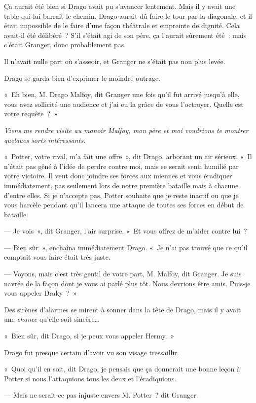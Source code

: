 Ça aurait été bien si Drago avait pu s'avancer lentement.
Mais il y avait une table qui lui barrait le chemin, Drago aurait dû faire le tour par la diagonale, et il était impossible de le faire d'une façon théâtrale et empreinte de dignité.
Cela avait-il été délibéré~?
S'il s'était agi de son père, ça l'aurait sûrement été~; mais c'était Granger, donc probablement pas.

Il n'avait nulle part où s'asseoir, et Granger ne s'était pas non plus levée.

Drago se garda bien d'exprimer le moindre outrage.

«~Eh bien, M. Drago Malfoy, dit Granger une fois qu'il fut arrivé jusqu'à elle, vous avez sollicité une audience et j'ai eu la grâce de vous l'octroyer.
Quelle est votre requête~?~»

\emph{Viens me rendre visite au manoir Malfoy, mon père et moi voudrions te montrer quelques sorts intéressants.}

«~Potter, votre rival, m'a fait une offre~», dit Drago, arborant un air sérieux.
«~Il n'était pas gêné à l'idée de perdre contre moi, mais se serait senti humilié par votre victoire.
Il veut donc joindre ses forces aux miennes et vous éradiquer immédiatement, pas seulement lors de notre première bataille mais à chacune d'entre elles.
Si je n'accepte pas, Potter souhaite que je reste inactif ou que je vous harcèle pendant qu'il lancera une attaque de toutes ses forces en début de bataille.

--- Je vois~», dit Granger, l'air surprise.
«~Et vous offrez de m'aider contre lui~?

--- Bien sûr~», enchaîna immédiatement Drago.
«~Je n'ai pas trouvé que ce qu'il comptait vous faire était très juste.

--- Voyons, mais c'est très gentil de votre part, M. Malfoy, dit Granger.
Je suis navrée de la façon dont je vous ai parlé plus tôt.
Nous devrions être amis.
Puis-je vous appeler Draky~?~»

Des sirènes d'alarmes se mirent à sonner dans la tête de Drago, mais il y avait une \emph{chance} qu'elle soit sincère…

«~Bien sûr, dit Drago, si je peux vous appeler Hermy.~»

Drago fut presque certain d'avoir vu son visage tressaillir.

«~Quoi qu'il en soit, dit Drago, je pensais que ça donnerait une bonne leçon à Potter si nous l'attaquions tous les deux et l'éradiquions.

--- Mais ne serait-ce pas injuste envers M. Potter~? dit Granger.

